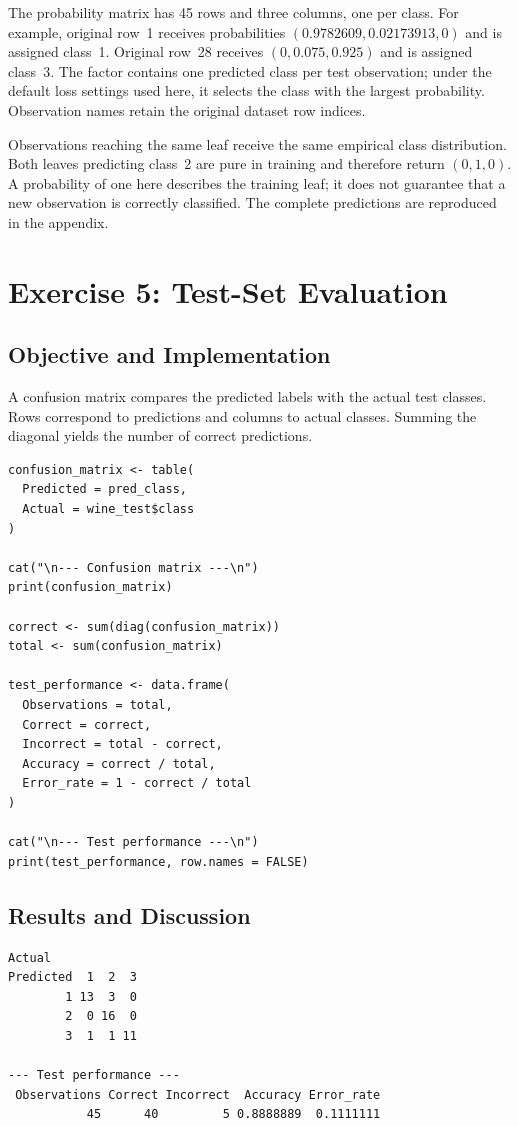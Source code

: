 \documentclass[11pt,a4paper]{article}
\begin{document}
The probability matrix has 45 rows and three columns, one per class. For example, original row~1 receives probabilities $(0.9782609, 0.02173913, 0)$ and is assigned class~1. Original row~28 receives $(0, 0.075, 0.925)$ and is assigned class~3. The factor contains one predicted class per test observation; under the default loss settings used here, it selects the class with the largest probability. Observation names retain the original dataset row indices.

Observations reaching the same leaf receive the same empirical class distribution. Both leaves predicting class~2 are pure in training and therefore return $(0,1,0)$. A probability of one here describes the training leaf; it does not guarantee that a new observation is correctly classified. The complete predictions are reproduced in the appendix.

\section{Exercise 5: Test-Set Evaluation}
\subsection{Objective and Implementation}
A confusion matrix compares the predicted labels with the actual test classes. Rows correspond to predictions and columns to actual classes. Summing the diagonal yields the number of correct predictions.
\begin{lstlisting}
confusion_matrix <- table(
  Predicted = pred_class,
  Actual = wine_test$class
)

cat("\n--- Confusion matrix ---\n")
print(confusion_matrix)

correct <- sum(diag(confusion_matrix))
total <- sum(confusion_matrix)

test_performance <- data.frame(
  Observations = total,
  Correct = correct,
  Incorrect = total - correct,
  Accuracy = correct / total,
  Error_rate = 1 - correct / total
)

cat("\n--- Test performance ---\n")
print(test_performance, row.names = FALSE)
\end{lstlisting}

\subsection{Results and Discussion}
\par\noindent\begin{minipage}{\linewidth}
  \begin{lstlisting}[style=console]
Actual
Predicted  1  2  3
        1 13  3  0
        2  0 16  0
        3  1  1 11

--- Test performance ---
 Observations Correct Incorrect  Accuracy Error_rate
           45      40         5 0.8888889  0.1111111
\end{lstlisting}
\end{minipage}\par
\end{document}
